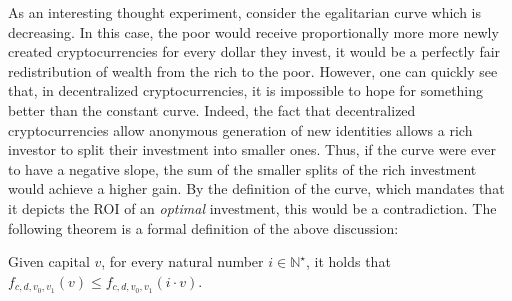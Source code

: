 As an interesting thought experiment, consider the egalitarian curve which is
decreasing. In this case, the poor would receive proportionally more more newly
created cryptocurrencies for every dollar they invest, \ie it would be a
perfectly fair redistribution of wealth from the rich to the poor. However, one
can quickly see that, in decentralized cryptocurrencies, it is impossible to
hope for something better than the constant curve. Indeed, the fact that
decentralized cryptocurrencies allow anonymous generation of new identities
allows a rich investor to split their investment into smaller ones.  Thus, if
the curve were ever to have a negative slope, the sum of the smaller splits of
the rich investment would achieve a higher gain. By the definition of the
curve, which mandates that it depicts the ROI of an \emph{optimal} investment,
this would be a contradiction. The following theorem is a formal definition of
the above discussion:

\begin{theorem}
    Given capital $v$, for every natural number $i \in \mathbb{N}^\star$, it
    holds that $f_{c,d,v_0,v_1}(v) \leq f_{c,d,v_0,v_1}(i \cdot v)$.
\end{theorem}

